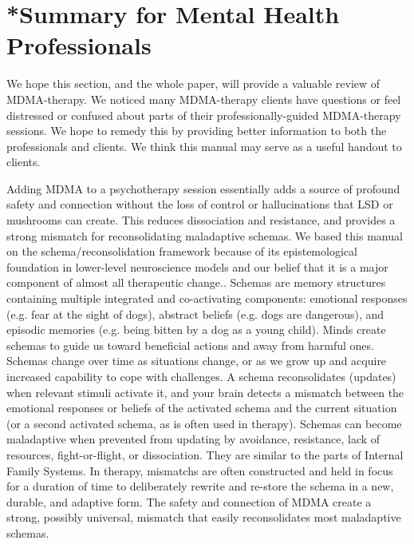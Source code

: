 \documentclass[12pt,letterpaper]{article}
\begin{document}
\section{*Summary for Mental Health Professionals}
We hope this section, and the whole paper, will provide a valuable review of MDMA-therapy. We noticed many MDMA-therapy clients have questions or feel distressed or confused about parts of their professionally-guided MDMA-therapy sessions. We hope to remedy this by providing better information to both the professionals and clients. We think this manual may serve as a useful handout to clients.

Adding MDMA to a psychotherapy session essentially adds a source of profound safety and connection without the loss of control or hallucinations that LSD or mushrooms can create. This reduces dissociation and resistance, and provides a strong mismatch for reconsolidating maladaptive schemas. We based this manual on the schema/reconsolidation framework because of its epistemological foundation in lower-level neuroscience models and our belief that it is a major component of almost all therapeutic change.. Schemas are memory structures containing multiple integrated and co-activating components: emotional responses (e.g. fear at the sight of dogs), abstract beliefs (e.g. dogs are dangerous), and episodic memories (e.g. being bitten by a dog as a young child). Minds create schemas to guide us toward beneficial actions and away from harmful ones. Schemas change over time as situations change, or as we grow up and acquire increased capability to cope with challenges. A schema reconsolidates (updates) when relevant stimuli activate it, and your brain detects a mismatch between the emotional responses or beliefs of the activated schema and the current situation (or a second activated schema, as is often used in therapy). Schemas can become maladaptive when prevented from updating by avoidance, resistance, lack of resources, fight-or-flight, or dissociation. They are similar to the parts of Internal Family Systems. In therapy, mismatchs are often constructed and held in focus for a duration of time to deliberately rewrite and re-store the schema in a new, durable, and adaptive form. The safety and connection of MDMA create a strong, possibly universal, mismatch that easily reconsolidates most maladaptive schemas.
\end{document}
